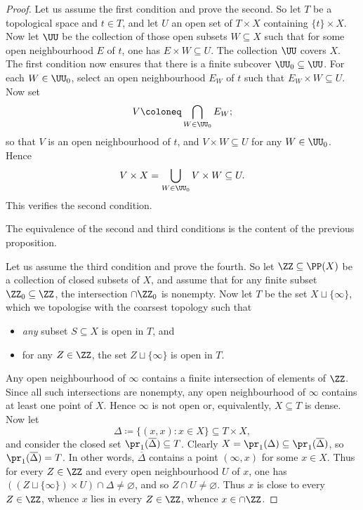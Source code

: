 \begin{proof}
	Let us assume the first condition and prove the second.
	So let $T$ be a topological space and $t\in T$, and
	let $U$ an open set of $T\times X$ containing $\{t\}\times X$.
	Now let $\UU$ be the collection of those open subsets $W\subseteq X$ such that for some open neighbourhood $E$ of $t$, one has $E\times W\subseteq U$.
	The collection $\UU$ covers%
	$X$.
	The first condition now ensures that there is a finite subcover $\UU_0\subseteq\UU$.
	For each $W\in\UU_0$, select an open neighbourhood $E_W$ of $t$ such that $E_W\times W\subseteq U$.
	Now set
	\[
		V\coloneq\bigcap_{W\in\UU_0}E_W;
	\]
	so that $V$ is an open neighbourhood of $t$, and $V\times W\subseteq U$ for any $W\in\UU_0$. Hence
	\[
		V\times X=\bigcup_{W\in\UU_0}V\times W\subseteq U.
	\]
	This verifies the second condition.

	The equivalence of the second and third conditions is the content of the previous proposition.

	Let us assume the third condition and prove the fourth.
	So let $\ZZ\subseteq\PP(X)$ be a collection of closed subsets of $X$, and
	assume that for any finite subset $\ZZ_0\subseteq\ZZ$, the intersection $\cap\ZZ_0$ is nonempty.
	Now let $T$ be the set $X\sqcup\{\infty\}$, which we topologise with the coarsest topology such that%
	\begin{itemize}
		\item \emph{any} subset $S\subseteq X$ is open in $T$, and
		\item for any $Z\in\ZZ$, the set $Z\sqcup\{∞\}$ is open in $T$.
	\end{itemize}
	Any open neighbourhood of $\infty$ contains a finite intersection of elements of $\ZZ$.
	Since all such intersections are nonempty, any open neighbourhood of $\infty$ contains at least one point of $X$.
	Hence $\infty$ is not open or, equivalently, $X\subseteq T$ is dense.
	Now let
	\[
		\Delta \coloneq \{(x,x) : x\in X\} \subseteq T\times X\comma
	\]
	and consider the closed set $\pr_1(\overline{\Delta})\subseteq T$.
	Clearly $X=\pr_1(\Delta)\subseteq\pr_1(\overline{\Delta})$, so $\pr_1(\overline{\Delta})=T$.
	In other words, $\overline{\Delta}$ contains a point $(∞, x)$ for some $x\in X$.
	Thus for every $Z\in\ZZ$ and every open neighbourhood $U$ of $x$, one has $((Z\sqcup\{∞\})\times U)\cap\Delta\neq\varnothing$, and so%
	$Z\cap U\neq\varnothing$.
	Thus $x$ is close to every $Z\in\ZZ$, whence $x$ lies in every $Z\in\ZZ$, whence $x\in\cap\ZZ$.


\end{proof}
